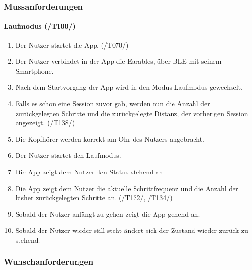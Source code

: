 \documentclass[a4paper,12pt]{article}
\begin{document}
    \subsubsection{Mussanforderungen}
      \paragraph{Laufmodus (/T100/)}
      \begin{enumerate}
        \item Der Nutzer startet die App. (/T070/)
        \item Der Nutzer verbindet in der App die \gls{Earables}, über \gls{BLE} mit seinem Smartphone.
        \item Nach dem Startvorgang der App wird in den Modus \glqq Laufmodus\grqq{} gewechselt.
        \item Falls es schon eine Session zuvor gab, werden nun die Anzahl der zurückgelegten Schritte und die zurückgelegte Distanz, der vorherigen Session angezeigt. (/T138/)
        \item Die Kopfhörer werden korrekt am Ohr des Nutzers angebracht.
        \item Der Nutzer startet den Laufmodus.
        \item Die App zeigt dem Nutzer den Status \glqq stehend\grqq{} an.
        \item Die App zeigt dem Nutzer die aktuelle \gls{Schrittfrequenz} und die Anzahl der bisher zurückgelegten Schritte an. (/T132/, /T134/)
        \item Sobald der Nutzer anfängt zu gehen zeigt die App \glqq gehend\grqq{} an.
        \item Sobald der Nutzer wieder still steht ändert sich der Zustand wieder zurück zu \glqq stehend\grqq. 
      \end{enumerate}

    \subsubsection{Wunschanforderungen}

    
\end{document}
